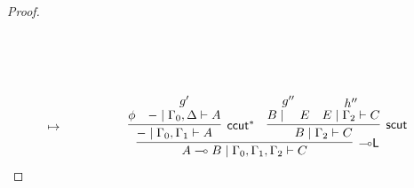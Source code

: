 \documentclass[sn-mathphys-num]{sn-jnl}%
\newcommand{\GG}{\Gamma}
\newcommand{\GD}{\Delta}
\newcommand{\vd}{\vdash}
\newcommand{\lolli}{\multimap}
\newcommand{\lleft}{{\lolli}\mathsf{L}}
\newcommand{\lright}{{\lolli}\mathsf{R}}
\newcommand{\mf}[1]{\mathsf{#1}}
\theoremstyle{thmstyleone}%
\theoremstyle{thmstyletwo}%
\theoremstyle{thmstylethree}%
\begin{document}
\begin{proof}
\begin{displaymath}
\begin{array}{lr}
\\[1.5cm]
    \mapsto&
    \qquad \qquad
    \begin{array}{c}
      \infer[\lleft]{A \lolli B \mid \GG_0 , \GG_1 , \GG_2 \vd C}{
        \infer[\mf{ccut}^*]{{-} \mid \GG_0 , \GG_1 \vd A}{
          \phi
          &
          \deduce{{-} \mid \GG_0 , \GD \vd A}{g'}
        }
        &
        \infer[\mf{scut}]{B \mid \GG_2 \vd C}{
          \deduce{B \mid \quad E}{g''}
          &
          \deduce{E \mid \GG_2 \vd C}{h''}
        }
      }
    \end{array}
  \end{array}
\end{displaymath}

\end{proof}
\end{document}
